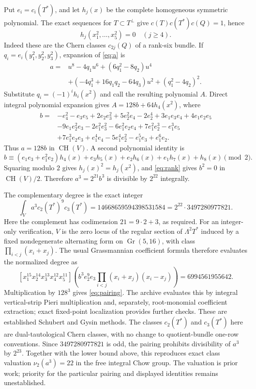 \documentclass[11pt]{article}
\newcommand{\CH}{\operatorname{CH}}
\begin{document}
Put $e_i=c_i(T^*)$, and let $h_j(x)$ be the complete homogeneous
symmetric polynomial. The exact sequences for $T\subset T^\perp$
give $c(T)c(T^*)c(Q)=1$, hence
\begin{equation}\label{eq:rank}
                       h_j(x_1^2,\ldots,x_5^2)=0\quad(j\geq4).
\end{equation}
Indeed these are the Chern classes $c_{2j}(Q)$ of a rank-six bundle.
If $q_i=e_i(y_1^2,y_2^2,y_3^2)$, expansion of \eqref{eq:a} is
\[
\begin{aligned}
 a={}&u^8-4q_1u^6+(6q_1^2-8q_2)u^4\\
     &+(-4q_1^3+16q_1q_2-64q_3)u^2+(q_1^2-4q_2)^2.
\end{aligned}
\]
Substitute $q_i=(-1)^ih_i(x^2)$ and call the resulting polynomial $A$.
Direct integral polynomial expansion gives
$A=128b+64h_4(x^2)$, where
\[
\begin{aligned}
b={}&-e_4^2-e_3e_5+2e_2e_3^2+5e_2^2e_4-2e_2^4
      +3e_1e_3e_4+4e_1e_2e_5\\
 &-9e_1e_2^2e_3-2e_1^2e_3^2-6e_1^2e_2e_4+7e_1^2e_2^3
      -e_1^3e_5\\
 &+7e_1^3e_2e_3+e_1^4e_4-5e_1^4e_2^2-e_1^5e_3+e_1^6e_2.
\end{aligned}
\]
Thus $a=128b$ in $\CH(V)$. A second polynomial identity is
\[
 b\equiv(e_1e_3+e_1^2e_2)h_4(x)+e_3h_5(x)+e_2h_6(x)
                      +e_1h_7(x)+h_8(x)\pmod2.
\]
Squaring modulo $2$ gives $h_j(x)^2=h_j(x^2)$, and
\eqref{eq:rank} gives $b^2=0$ in $\CH(V)/2$. Therefore
$a^3=2^{21}b^3$ is divisible by $2^{22}$ integrally.

The complementary degree is the exact integer
\begin{equation}\label{eq:pairing}
 \int_V a^3c_2(T^*)^9c_3(T^*)
 =14668659594398531584=2^{22}\cdot3497280977821.
\end{equation}
Here the complement has codimension $21=9\cdot2+3$, as required.
For an integer-only verification, $V$ is the zero locus of the regular
section of $\Lambda^2T^*$ induced by a fixed nondegenerate alternating form on
$\operatorname{Gr}(5,16)$, with class
$\prod_{i<j}(x_i+x_j)$. The usual Grassmannian coefficient formula
\cite{gysin} therefore evaluates the normalized degree as
\[
 [x_1^{15}x_2^{14}x_3^{13}x_4^{12}x_5^{11}]
 \left(b^3e_2^9e_3\prod_{i<j}(x_i+x_j)(x_i-x_j)\right)
                =6994561955642.
\]
Multiplication by $128^3$ gives \eqref{eq:pairing}. The archive evaluates
this by integral vertical-strip Pieri multiplication and, separately,
root-monomial coefficient extraction; exact fixed-point localization
provides further checks. These are established Schubert and Gysin
methods. The classes $c_2(T^*)$ and $c_3(T^*)$ here are dual-tautological
Chern classes, with no change to quotient-bundle one-row conventions.
Since $3497280977821$ is odd, the pairing prohibits
divisibility of $a^3$ by $2^{23}$. Together with the lower bound above,
this reproduces exact class valuation $\nu_2(a^3)=22$ in the free
integral Chow group. The valuation is prior work; priority for the
particular pairing and displayed identities remains unestablished.
\end{document}
